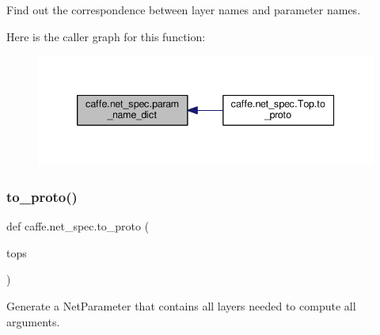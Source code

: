 \begin{DoxyVerb}Find out the correspondence between layer names and parameter names.\end{DoxyVerb}
 Here is the caller graph for this function\+:
\nopagebreak
\begin{figure}[H]
\begin{center}
\leavevmode
\includegraphics[width=339pt]{namespacecaffe_1_1net__spec_a743950197e4a2ce816bcc4ec5bb04968_icgraph}
\end{center}
\end{figure}
\mbox{\label{namespacecaffe_1_1net__spec_a8d5d3cab109867ec42e5e7c2b957e630}} 
\subsubsection{\texorpdfstring{to\+\_\+proto()}{to\_proto()}}
{\footnotesize\ttfamily def caffe.\+net\+\_\+spec.\+to\+\_\+proto (\begin{DoxyParamCaption}\item[{}]{tops }\end{DoxyParamCaption})}

\begin{DoxyVerb}Generate a NetParameter that contains all layers needed to compute
all arguments.\end{DoxyVerb}
 